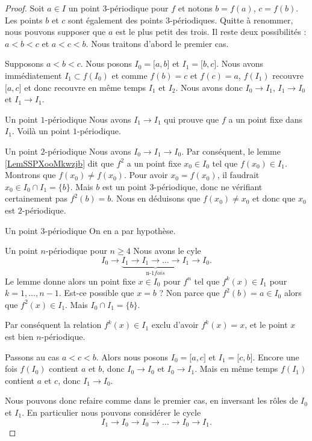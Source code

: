\begin{proof}
    Soit \( a\in I\) un point \( 3\)-périodique pour \( f\) et notons \( b=f(a)\), \( c=f(b)\). Les points \( b\) et \( c\) sont également des points \( 3\)-périodiques. Quitte à renommer, nous pouvons supposer que \( a\) est le plus petit des trois. Il reste deux possibilités : \( a<b<c\) et \( a<c<b\). Nous traitons d'abord le premier cas.

    Supposons \( a<b<c\). Nous posons \( I_0=\mathopen[ a , b \mathclose]\) et \( I_1=\mathopen[ b , c \mathclose]\). Nous avons immédiatement \( I_1\subset f(I_0)\) et comme \( f(b)=c\) et \( f(c)=a\), \( f(I_1)\) recouvre \( \mathopen[ a , c \mathclose]\) et donc recouvre en même temps \( I_1\) et \( I_2\). Nous avons donc \( I_0\to I_1\), \( I_1\to I_0\) et \( I_1\to I_1\).
    \begin{subproof}
    \item[Un point \( 1\)-périodique]
        Nous avons \( I_1\to I_1\) qui prouve que \( f\) a un point fixe dans \( I_1\). Voilà un point \( 1\)-périodique.
    \item[Un point \( 2\)-périodique]
        Nous avons \( I_0\to I_1\to I_0\). Par conséquent, le lemme \ref{LemSSPXooMkwzjb} dit que \( f^2\) a un point fixe \( x_0\in I_0\) tel que \( f(x_0)\in I_1\). Montrons que \( f(x_0)\neq f(x_0)\). Pour avoir \( x_0=f(x_0)\), il faudrait \( x_0\in I_0\cap I_1=\{ b \}\). Mais \( b\) est un point \( 3\)-périodique, donc ne vérifiant certainement pas \( f^2(b)=b\). Nous en déduisons que \( f(x_0)\neq x_0\) et donc que \( x_0\) est \( 2\)-périodique.
    \item[Un point \( 3\)-périodique]
        On en a par hypothèse.
    \item[Un point \( n\)-périodique pour \( n\geq 4\)]
        Nous avons le cyle
        \begin{equation}
            I_0\to \underbrace{I_1\to I_1\to\ldots\to I_1}_{\text{n-1} fois}\to I_0.
        \end{equation}
        Le lemme donne alors un point fixe \( x\in I_0\) pour \( f^n\) tel que \( f^k(x)\in I_1\) pour \( k=1,\ldots, n-1\). Est-ce possible que \( x=b\) ? Non parce que \( f^2(b)=a\in I_0\) alors que \( f^2(x)\in I_1\). Mais \( I_0\cap I_1=\{ b \}\).

        Par conséquent la relation \( f^k(x)\in I_1\) exclu d'avoir \( f^k(x)=x\), et le point \( x\) est bien \( n\)-périodique.
    \end{subproof} 
    
    Passons au cas \( a<c<b\). Alors nous posons \( I_0=\mathopen[ a , c \mathclose]\) et \( I_1=\mathopen[ c , b \mathclose]\). Encore une fois \( f(I_0)\) contient \( a\) et \( b\), donc \( I_0\to I_0\) et \( I_0\to I_1\). Mais en même temps \( f(I_1)\) contient \( a\) et \( c\), donc \( I_1\to I_0\).

    Nous pouvons donc refaire comme dans le premier cas, en inversant les rôles de \( I_0\) et \( I_1\). En particulier nous pouvons considérer le cycle
    \begin{equation}
        I_1\to I_0\to I_0\to\ldots\to I_0\to I_1.
    \end{equation}
\end{proof}

